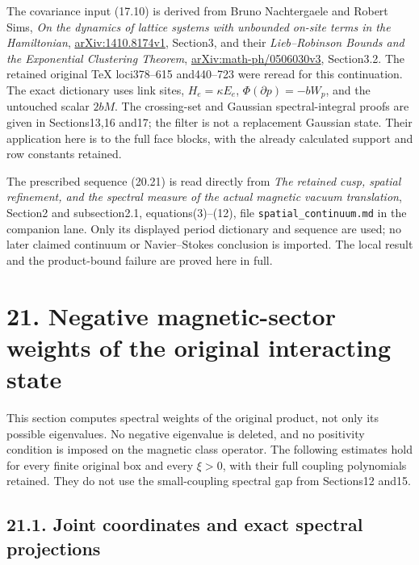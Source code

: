 \documentclass[
]{article}
\begin{document}
The covariance input (17.10) is derived from Bruno Nachtergaele and
Robert Sims, \emph{On the dynamics of lattice systems with unbounded
on-site terms in the Hamiltonian},
\href{https://arxiv.org/abs/1410.8174v1}{arXiv:1410.8174v1}, Section3,
and their \emph{Lieb--Robinson Bounds and the Exponential Clustering
Theorem},
\href{https://arxiv.org/abs/math-ph/0506030v3}{arXiv:math-ph/0506030v3},
Section3.2. The retained original TeX loci378--615 and440--723 were
reread for this continuation. The exact dictionary uses link sites,
\(H_e=\kappa E_e\), \(\Phi(\partial p)=-bW_p\), and the untouched scalar
\(2bM\). The crossing-set and Gaussian spectral-integral proofs are
given in Sections13,16 and17; the filter is not a replacement Gaussian
state. Their application here is to the full face blocks, with the
already calculated support and row constants retained.

The prescribed sequence (20.21) is read directly from \emph{The retained
cusp, spatial refinement, and the spectral measure of the actual
magnetic vacuum translation}, Section2 and subsection2.1,
equations(3)--(12), file \texttt{spatial\_continuum.md} in the companion
lane. Only its displayed period dictionary and sequence are used; no
later claimed continuum or Navier--Stokes conclusion is imported. The
local result and the product-bound failure are proved here in full.

\section{21. Negative magnetic-sector weights of the original
interacting
state}\label{negative-magnetic-sector-weights-of-the-original-interacting-state}

This section computes spectral weights of the original product, not only
its possible eigenvalues. No negative eigenvalue is deleted, and no
positivity condition is imposed on the magnetic class operator. The
following estimates hold for every finite original box and every
\(\xi>0\), with their full coupling polynomials retained. They do not
use the small-coupling spectral gap from Sections12 and15.

\subsection{21.1. Joint coordinates and exact spectral
projections}\label{joint-coordinates-and-exact-spectral-projections}
\end{document}
